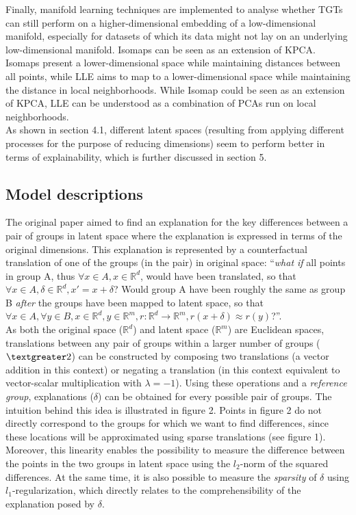 Finally, manifold learning techniques are implemented to analyse whether TGTs can still perform on a higher-dimensional embedding of a low-dimensional manifold, especially for datasets of which its data might not lay on an underlying low-dimensional manifold. Isomaps can be seen as an extension of KPCA. Isomaps present a lower-dimensional space while maintaining distances between all points, while LLE aims to map to a lower-dimensional space while maintaining the distance in local neighborhoods. While Isomap could be seen as an extension of KPCA, LLE can be understood as a combination of PCAs run on local neighborhoods.\\

As shown in section 4.1, different latent spaces (resulting from applying different processes for the purpose of reducing dimensions) seem to perform better in terms of explainability, which is further discussed in section 5.


\subsection{Model descriptions}
The original paper aimed to find an explanation for the key differences between a pair of groups in latent space where the explanation is expressed in terms of the original dimensions. This explanation is represented by a counterfactual translation of one of the groups (in the pair) in original space: ``\textit{what if} all points in group A, thus $\forall x \in A, x \in \mathbb{R}^d$, would have been translated, so that $\forall x \in A, \delta \in \mathbb{R}^d, x' = x + \delta$? Would group A have been roughly the same as group B \textit{after} the groups have been mapped to latent space, so that $\forall x \in A, \forall y \in B, x \in \mathbb{R}^d, y \in \mathbb{R}^m, r: \mathbb{R}^d \to \mathbb{R}^m, r(x + \delta) \approx r(y)$?''.\\

As both the original space ($\mathbb{R}^d$) and latent space ($\mathbb{R}^m$) are Euclidean spaces, translations between any pair of groups within a larger number of groups ($\textgreater 2$) can be constructed by composing two translations (a vector addition in this context) or negating a translation (in this context equivalent to vector-scalar multiplication with $\lambda = -1$). Using these operations and a \textit{reference group}, explanations ($\delta$) can be obtained for every possible pair of groups. The intuition behind this idea is illustrated in figure 2. Points in figure 2 do not directly correspond to the groups for which we want to find differences, since these locations will be approximated using sparse translations (see figure 1). Moreover, this linearity enables the possibility to measure the difference between the points in the two groups in latent space using the $l_2$-norm of the squared differences. At the same time, it is also possible to measure the \textit{sparsity} of $\delta$ using $l_1$-regularization, which directly relates to the comprehensibility of the explanation posed by $\delta$.\\

